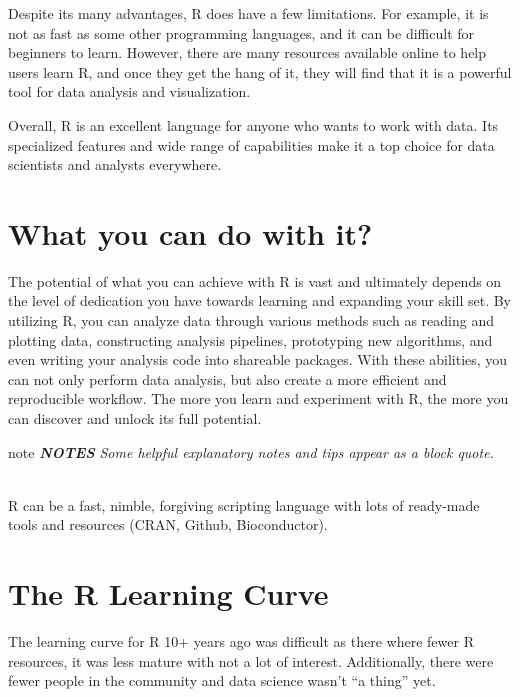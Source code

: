 \documentclass[
]{book}
\begin{document}
Despite its many advantages, R does have a few limitations. For example, it is not as fast as some other programming languages, and it can be difficult for beginners to learn. However, there are many resources available online to help users learn R, and once they get the hang of it, they will find that it is a powerful tool for data analysis and visualization.

Overall, R is an excellent language for anyone who wants to work with data. Its specialized features and wide range of capabilities make it a top choice for data scientists and analysts everywhere.

\hypertarget{what-you-can-do-with-it}{%
\section*{What you can do with it?}\label{what-you-can-do-with-it}}

The potential of what you can achieve with R is vast and ultimately depends on the level of dedication you have towards learning and expanding your skill set. By utilizing R, you can analyze data through various methods such as reading and plotting data, constructing analysis pipelines, prototyping new algorithms, and even writing your analysis code into shareable packages. With these abilities, you can not only perform data analysis, but also create a more efficient and reproducible workflow. The more you learn and experiment with R, the more you can discover and unlock its full potential.

\begin{infobox}{note}
\emph{\textbf{NOTES} Some helpful explanatory notes and tips appear as a block quote.}\\
\strut \\
R can be a fast, nimble, forgiving scripting language with lots of ready-made tools and resources (CRAN, Github, Bioconductor).

\end{infobox}

\hypertarget{the-r-learning-curve}{%
\section*{The R Learning Curve}\label{the-r-learning-curve}}

The learning curve for R 10+ years ago was difficult as there where fewer R resources, it was less mature with not a lot of interest. Additionally, there were fewer people in the community and data science wasn't ``a thing'' yet.
\end{document}
